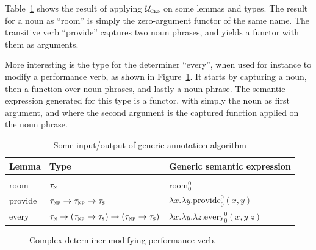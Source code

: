 \begin{example}
	Table~\ref{tabel:Ugen} shows the result of applying $\mathcal{U}_\textsc{gen}\,$on some lemmas and types. The result for a noun as ``room'' is simply the zero-argument functor of the same name. The transitive verb ``provide'' captures two noun phrases, and yields a functor with them as arguments.

	More interesting is the type for the determiner ``every'', when used for instance to modify a performance verb, as shown in Figure~\ref{fig:performanceVerb}. It starts by capturing a noun, then a function over noun phrases, and lastly a noun phrase. The semantic expression generated for this type is a functor, with simply the noun as first argument, and where the second argument is the captured function applied on the noun phrase.

\vspace{1em}
	\begin{table}[!h]
	\begin{center}
	\begin{tabular}{ll|l}
		Lemma & Type & Generic semantic expression \\ \hline		
		&&\\[-8pt]
		room & $\tau_\textsc{n}$ & $\mathrm{room}_0^0$ \\
		provide & $\tau_\textsc{np} \to \tau_\textsc{np} \to \tau_\textsc{s}$ & $\lambda x.\lambda y.\mathrm{provide}_0^0(x, y)$ \\
		every & $\tau_\textsc{n} \to (\tau_\textsc{np} \to \tau_\textsc{s}) \to (\tau_\textsc{np} \to \tau_\textsc{s})$ & $\lambda x.\lambda y.\lambda z.\mathrm{every}_{0}^{0}(x, y\;z)$
	\end{tabular}
	\end{center}
		\caption{Some input/output of generic annotation algorithm}
		\label{tabel:Ugen}
	\end{table}

\vspace{2em}

	\begin{figure}[ht]
	\center
	\caption{Complex determiner modifying performance verb.}
	\label{fig:performanceVerb}
	\end{figure}
	\label{ex:Ugen}
	
\end{example}
\done
\vspace{1em}


